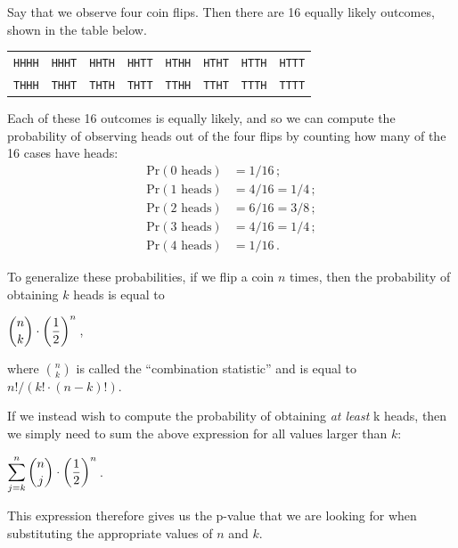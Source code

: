 Say that we observe four coin flips. Then there are 16 equally likely outcomes, shown in the table below.

\begin{center}
\begin{tabular}{c c c c c c c c}
\texttt{HHHH} & \texttt{HHHT} & \texttt{HHTH} & \texttt{HHTT} & \texttt{HTHH} & \texttt{HTHT} & \texttt{HTTH} & \texttt{HTTT}\\
\texttt{THHH} & \texttt{THHT} & \texttt{THTH} & \texttt{THTT} & \texttt{TTHH} & \texttt{TTHT} & \texttt{TTTH} & \texttt{TTTT}\\
\end{tabular}
\end{center}

\noindent Each of these 16 outcomes is equally likely, and so we can compute the probability of observing  heads out of the four flips by counting how many of the 16 cases have  heads:
\begin{align*}
\mathrm{Pr}(\text{0 heads}) &= 1/16\,;\\
\mathrm{Pr}(\text{1 heads}) & = 4/16 = 1/4\,;\\
\mathrm{Pr}(\text{2 heads}) & = 6/16 = 3/8\,;\\
\mathrm{Pr}(\text{3 heads}) & = 4/16 = 1/4\,;\\
\mathrm{Pr}(\text{4 heads}) & = 1/16\,.
\end{align*}

To generalize these probabilities, if we flip a coin $n$ times, then the probability of obtaining $k$ heads is equal to 

\begin{center}
$\dbinom{n}{k} \cdot \left(\dfrac{1}{2}\right)^n$\,,
\end{center}

\noindent where $\binom{n}{k}$ is called the ``combination statistic'' and is equal to $n!/(k! \cdot (n-k)!)$.

If we instead wish to compute the probability of obtaining \textit{at least} k heads, then we simply need to sum the above expression for all values larger than $k$:

\begin{center}
$\displaystyle\sum\limits_{j=k}^n{\dbinom{n}{j} \cdot \left(\dfrac{1}{2}\right)^n}$\,.
\end{center}

\noindent This expression therefore gives us the p-value that we are looking for when substituting the appropriate values of $n$ and $k$.\\

